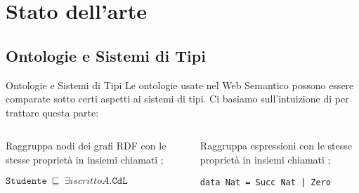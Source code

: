 \section{Stato dell'arte}

\subsection{Ontologie e Sistemi di Tipi}
\begin{frame}[containsverbatim]{Ontologie e Sistemi di Tipi}
	Le ontologie usate nel Web Semantico possono essere comparate sotto certi aspetti ai sistemi di tipi. Ci basiamo sull'intuizione di  per trattare questa parte:
	
	\begin{columns}
		\begin{column}[T]{0.45\textwidth}
		\begin{center}
		\end{center}
			Raggruppa nodi dei grafi RDF con le stesse proprietà in insiemi chiamati ;
			\begin{example}
				$\texttt{Studente}~\sqsubseteq~\exists iscrittoA.\texttt{CdL}$
			\end{example}
		
	\end{column}
	\hspace{0.05\textwidth}
	\begin{column}[T]{0.45\textwidth}
		\begin{center}
		\end{center}
		Raggruppa espressioni con le stesse proprietà in insiemi chiamati ;
		\begin{example}
			\begin{verbatim}
data Nat = Succ Nat | Zero
			\end{verbatim}
		\end{example}
	\end{column}
	\end{columns}
	
\end{frame}
